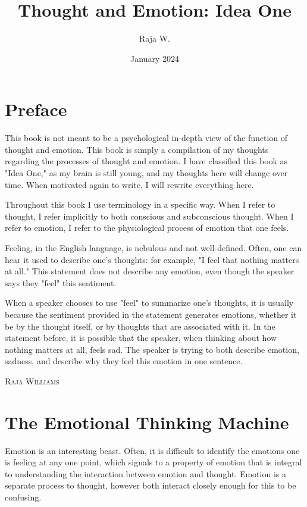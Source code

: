 \documentclass[11pt]{memoir}
\begin{document}
\frontmatter

\title{Thought and Emotion: Idea One}
\author{Raja W.}
\date{January 2024}
\maketitle

\mainmatter
\chapter{Preface}
This book is not meant to be a psychological in-depth view of the function of
thought and emotion. This book is simply a compilation of my thoughts regarding
the processes of thought and emotion. I have classified this book as "Idea One,"
as my brain is still young, and my thoughts here will change over time. When
motivated again to write, I will rewrite everything here.

Throughout this book I use terminology in a specific way. When I refer to
thought, I refer implicitly to both conscious and subconscious thought. When I
refer to emotion, I refer to the physiological process of emotion that one feels.

Feeling, in the English language, is nebulous and not well-defined. Often, one
can hear it used to describe one's thoughts: for example, "I feel that nothing
matters at all." This statement does not describe any emotion, even though the
speaker says they "feel" this sentiment.

When a speaker chooses to use "feel" to summarize one's thoughts, it is usually
because the sentiment provided in the statement generates emotions, whether it
be by the thought itself, or by thoughts that are associated with it. In the
statement before, it is possible that the speaker, when thinking about how
nothing matters at all, feels sad. The speaker is trying to both describe
emotion, sadness, and describe why they feel this emotion in one sentence.

\medskip
\begin{flushright}
    \textsc{Raja Williams}
\end{flushright}

\chapter{The Emotional Thinking Machine}
Emotion is an interesting beast. Often, it is difficult to identify the emotions
one is feeling at any one point, which signals to a property of emotion that is
integral to understanding the interaction between emotion and thought. Emotion
is a separate process to thought, however both interact closely enough for this
to be confusing.
\end{document}
